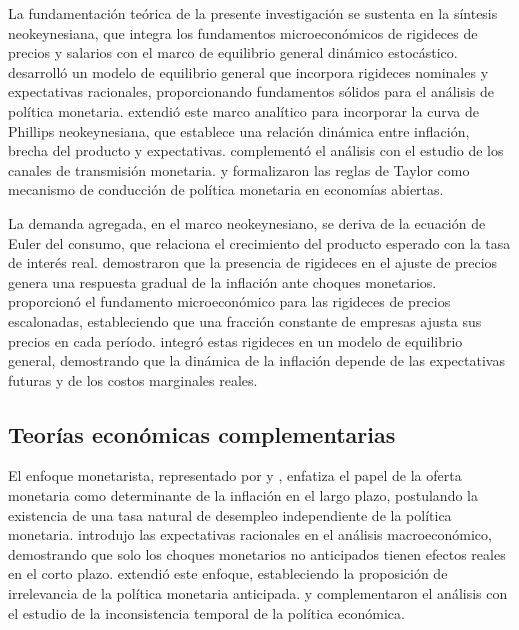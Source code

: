 \documentclass[12pt,a4paper]{article}
\begin{document}
La fundamentación teórica de la presente investigación se sustenta en la síntesis neokeynesiana, que integra los fundamentos microeconómicos de rigideces de precios y salarios con el marco de equilibrio general dinámico estocástico. \citet{woodford2003} desarrolló un modelo de equilibrio general que incorpora rigideces nominales y expectativas racionales, proporcionando fundamentos sólidos para el análisis de política monetaria. \citet{gali2008} extendió este marco analítico para incorporar la curva de Phillips neokeynesiana, que establece una relación dinámica entre inflación, brecha del producto y expectativas. \citet{walsh2010} complementó el análisis con el estudio de los canales de transmisión monetaria. \citet{clarida1999} y \citet{swenson2005} formalizaron las reglas de Taylor como mecanismo de conducción de política monetaria en economías abiertas.

La demanda agregada, en el marco neokeynesiano, se deriva de la ecuación de Euler del consumo, que relaciona el crecimiento del producto esperado con la tasa de interés real. \citet{rotemberg1995} demostraron que la presencia de rigideces en el ajuste de precios genera una respuesta gradual de la inflación ante choques monetarios. \citet{calvo1983} proporcionó el fundamento microeconómico para las rigideces de precios escalonadas, estableciendo que una fracción constante de empresas ajusta sus precios en cada período. \citet{yun1996} integró estas rigideces en un modelo de equilibrio general, demostrando que la dinámica de la inflación depende de las expectativas futuras y de los costos marginales reales.

\subsection{Teorías económicas complementarias}

El enfoque monetarista, representado por \citet{friedman1968} y \citet{phelps1967}, enfatiza el papel de la oferta monetaria como determinante de la inflación en el largo plazo, postulando la existencia de una tasa natural de desempleo independiente de la política monetaria. \citet{lucas1972} introdujo las expectativas racionales en el análisis macroeconómico, demostrando que solo los choques monetarios no anticipados tienen efectos reales en el corto plazo. \citet{barro1976} extendió este enfoque, estableciendo la proposición de irrelevancia de la política monetaria anticipada. \citet{sargent1981} y \citet{kyland1977} complementaron el análisis con el estudio de la inconsistencia temporal de la política económica.
\end{document}
